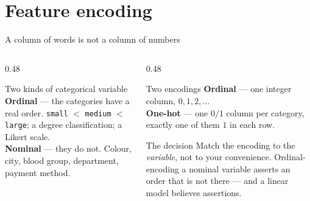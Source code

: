 \documentclass[aspectratio=169]{beamer}
\begin{document}
\section[Encoding]{Feature encoding}
\label{sec:encode}

\begin{frame}[shrink=6]{A column of words is not a column of numbers}
  \begin{columns}[T]
    \begin{column}{0.48\textwidth}
      \begin{block}{Two kinds of categorical variable}
        \textbf{Ordinal} --- the categories have a real order.
        \texttt{small} $<$ \texttt{medium} $<$ \texttt{large}; a degree
        classification; a Likert scale.\\[0.4em]
        \textbf{Nominal} --- they do not. Colour, city, blood group,
        department, payment method.
      \end{block}
    \end{column}
    \begin{column}{0.48\textwidth}
      \begin{exampleblock}{Two encodings}
        \textbf{Ordinal} --- one integer column, $0, 1, 2, \dots$\\[0.3em]
        \textbf{One-hot} --- one $0/1$ column per category, exactly one of
        them $1$ in each row.
      \end{exampleblock}
      \begin{alertblock}{The decision}
        \small Match the encoding to the \emph{variable}, not to your
        convenience. Ordinal-encoding a nominal variable asserts an order
        that is not there --- and a linear model believes assertions.
      \end{alertblock}
    \end{column}
  \end{columns}
\end{frame}
\end{document}
